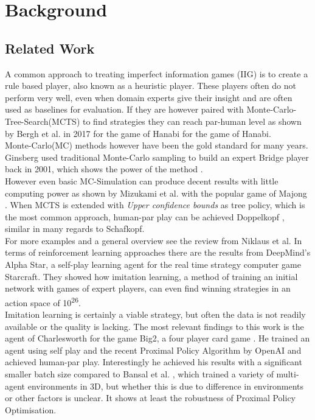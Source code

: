 \chapter{Background}

\section{Related Work}
A common approach to treating imperfect information games (IIG) is to create a rule based player, also known as a
heuristic player.
These players often do not perform very well, even when domain experts give their insight and are often used as
baselines for evaluation.
If they are however paired with Monte-Carlo-Tree-Search(MCTS) to find strategies they can reach par-human level as
shown by Bergh et al. in 2017 for the game of Hanabi\cite{hanabi} for the game of Hanabi.\\
Monte-Carlo(MC) methods however have been the gold standard for many years.
Ginsberg used traditional Monte-Carlo sampling to build an expert Bridge player back in 2001, which shows the power
of the method \cite{gib}.\\
However even basic MC-Simulation can produce decent results with little computing power as shown by Mizukami et al.
with the popular game of Majong \cite{mahjong}.
When MCTS is extended with \textit{Upper confidence bounds} as tree policy, which is the most common approach,
human-par play can be achieved Doppelkopf \cite{Doppelkopf}, similar in many regards to Schafkopf.\\
For more examples and a general overview see the review from Niklaus et al. \cite{niklaus2019survey}
\newline
In terms of reinforcement learning approaches there are the results from DeepMind's Alpha Star, a self-play learning
agent for the real time strategy computer game Starcraft.
They showed how imitation learning, a method of training an initial network with games of expert players, can even find
winning strategies in an action space of 10\textsuperscript{26}. \cite{Vinyals2019}\\
Imitation learning is certainly a viable strategy, but often the data is not readily available or the quality is
lacking.
\newline
The most relevant findings to this work is the agent of Charlesworth for the game Big2, a four player card game
.\cite{Charlesworth2018}
He trained an agent using self play and the recent Proximal Policy Algorithm by OpenAI \cite{Schulman2017} and
achieved human-par play.
Interestingly he achieved his results with a significant smaller batch size compared to Bansal et al.
\cite{Bansal2017}, which trained a variety of multi-agent environments in 3D, but whether this is due to
difference in environments or other factors is unclear.
It shows at least the robustness of Proximal Policy Optimisation.


